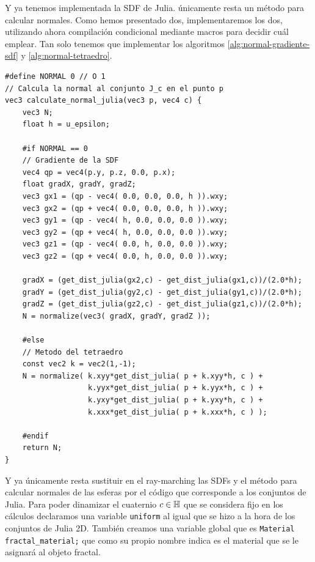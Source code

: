 Y ya tenemos implementada la SDF de Julia. únicamente resta un método para calcular normales. Como hemos presentado dos, implementaremos los dos, utilizando ahora compilación condicional mediante macros para decidir cuál emplear. Tan solo tenemos que implementar los algoritmos \ref{alg:normal-gradiente-sdf} y \ref{alg:normal-tetraedro}. %

\begin{lstlisting}
#define NORMAL 0 // O 1
// Calcula la normal al conjunto J_c en el punto p
vec3 calculate_normal_julia(vec3 p, vec4 c) {
    vec3 N;
    float h = u_epsilon;

    #if NORMAL == 0
    // Gradiente de la SDF
    vec4 qp = vec4(p.y, p.z, 0.0, p.x);
    float gradX, gradY, gradZ;
    vec3 gx1 = (qp - vec4( 0.0, 0.0, 0.0, h )).wxy;
    vec3 gx2 = (qp + vec4( 0.0, 0.0, 0.0, h )).wxy;
    vec3 gy1 = (qp - vec4( h, 0.0, 0.0, 0.0 )).wxy;
    vec3 gy2 = (qp + vec4( h, 0.0, 0.0, 0.0 )).wxy;
    vec3 gz1 = (qp - vec4( 0.0, h, 0.0, 0.0 )).wxy;
    vec3 gz2 = (qp + vec4( 0.0, h, 0.0, 0.0 )).wxy;
    
    gradX = (get_dist_julia(gx2,c) - get_dist_julia(gx1,c))/(2.0*h);
    gradY = (get_dist_julia(gy2,c) - get_dist_julia(gy1,c))/(2.0*h);
    gradZ = (get_dist_julia(gz2,c) - get_dist_julia(gz1,c))/(2.0*h);
    N = normalize(vec3( gradX, gradY, gradZ ));

    #else
    // Metodo del tetraedro
    const vec2 k = vec2(1,-1);
    N = normalize( k.xyy*get_dist_julia( p + k.xyy*h, c ) + 
                   k.yyx*get_dist_julia( p + k.yyx*h, c ) + 
                   k.yxy*get_dist_julia( p + k.yxy*h, c ) + 
                   k.xxx*get_dist_julia( p + k.xxx*h, c ) );

    #endif
    return N;
}
\end{lstlisting}

Y ya únicamente resta sustituir en el ray-marching las SDFs y el método para calcular normales de las esferas por el código que corresponde a los conjuntos de Julia. Para poder dinamizar el cuaternio $c\in\mathbb{H}$ que se considera fijo en los cálculos declaramos una variable \verb|uniform| al igual que se hizo a la hora de los conjuntos de Julia 2D. También creamos una variable global que es \verb|Material fractal_material;| que como su propio nombre indica es el material que se le asignará al objeto fractal.

